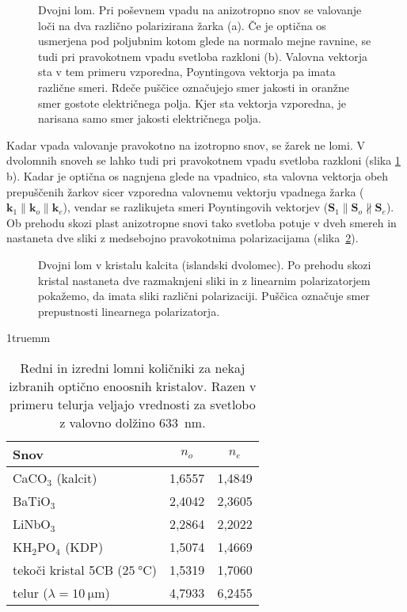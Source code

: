 \begin{figure}[ht]
\centering
\def\svgwidth{128truemm} 

\caption{Dvojni lom. Pri poševnem vpadu na anizotropno snov se
valovanje loči na dva različno polarizirana žarka (a). Če je optična os 
usmerjena pod poljubnim kotom glede na normalo mejne ravnine, se tudi pri pravokotnem vpadu
svetloba razkloni (b). Valovna vektorja sta v tem primeru vzporedna, 
Poyntingova vektorja pa imata različne smeri. Rdeče puščice označujejo smer
jakosti in oranžne smer gostote električnega polja. Kjer sta vektorja vzporedna, je narisana
samo smer jakosti električnega polja.}
\label{fig:dvolomnost}
\end{figure}

Kadar vpada valovanje pravokotno na izotropno snov, se žarek ne lomi. V 
dvolomnih snoveh se lahko tudi pri pravokotnem vpadu svetloba razkloni (slika
\ref{fig:dvolomnost}\,b). Kadar je optična os nagnjena glede na vpadnico, sta valovna vektorja
obeh prepuščenih žarkov sicer vzporedna valovnemu vektorju vpadnega žarka ($\mathbf{k}_1 \parallel
\mathbf{k}_o \parallel \mathbf{k}_e$), vendar se razlikujeta smeri Poyntingovih vektorjev
($\mathbf{S}_1 \parallel \mathbf{S}_o \nparallel \mathbf{S}_e$). Ob prehodu skozi 
plast anizotropne snovi tako svetloba potuje v dveh smereh in nastaneta dve sliki 
z medsebojno pravokotnima polarizacijama (slika~\ref{foto:dvolom}). 

\begin{figure}[ht]
\centering
\def\svgwidth{128truemm} 

\caption{Dvojni lom v kristalu kalcita (islandski dvolomec). 
Po prehodu skozi kristal nastaneta dve razmaknjeni sliki in z linearnim polarizatorjem 
pokažemo, da imata sliki različni polarizaciji. Puščica označuje smer prepustnosti
linearnega polarizatorja.}
\label{foto:dvolom}
\end{figure}
\vglue1truemm
\begin{table}[ht]
 \centering
\begin{tabular}{|l|c|c|} \hline  
      Snov & $n_o$ & $n_e$ \\ \hline
      CaCO$_3$ (kalcit) & 1,6557 & 1,4849 \\ \hline\index{CaCO$_3$|see {Kalcit}}
      BaTiO$_3$ & 2,4042 & 2,3605 \\ \hline \index{BaTiO$_3$}
      LiNbO$_3$ & 2,2864 & 2,2022 \\ \hline \index{LiNbO$_3$}
      KH$_2$PO$_4$ (KDP) & 1,5074 & 1,4669 \\ \hline \index{KH$_2$PO$_4$|see {KDP}}\index{KDP}
      tekoči kristal 5CB ($25~\si{\degreeCelsius}$) & 1,5319 & 1,7060 \\ 
      \hline \index{Tekoči kristali} \index{Telur}\index{Tekoči kristali!5CB}
      telur ($\lambda = 10~\si{\micro\metre}$) & 4,7933 & 6,2455 \\ 
\hline 
\end{tabular}
  \caption{Redni in izredni lomni količniki za nekaj izbranih optično enoosnih kristalov. Razen v primeru telurja
   veljajo vrednosti za svetlobo z valovno dolžino 633~\si{\nano\metre}.}
\label{table:none}
\end{table}
\vspace{6truecm}
